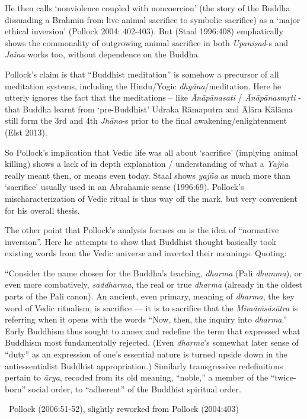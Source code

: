 \newpage

He then calls ‘nonviolence coupled with noncoercion’ (the story of the Buddha dissuading a Brahmin from live animal sacrifice to symbolic sacrifice) as a ‘major ethical inversion’ (Pollock 2004: 402-403). But (Staal 1996:408) emphatically shows the commonality of outgrowing animal sacrifice in both \textit{Upaniṣad}-s and \textit{Jaina} works too, without dependence on the Buddha.

Pollock’s claim is that “Buddhist meditation” is somehow a precursor of all meditation systems, including the Hindu/Yogic \textit{dhyāna}/medita\-tion. Here he utterly ignores the fact that the meditations – like \textit{Ānāpānasati} / \textit{Ānāpānasmṛti} - that Buddha learnt from ‘pre-Buddhist’ Udraka Rāmaputra and Ālāra Kālāma still form the 3rd and 4th \textit{Jhāna}-s prior to the final awakening/enlightenment (Elst 2013).

So Pollock’s implication that Vedic life was all about ‘sacrifice’ (implying animal killing) shows a lack of in depth explanation / understanding of what a \textit{Yajña} really meant then, or means even today. Staal shows \textit{yajña} as much more than ‘sacrifice’ usually used in an Abrahamic sense (1996:69). Pollock’s mischaracterization of Vedic ritual is thus way off the mark, but very convenient for his overall thesis.

The other point that Pollock’s analysis focuses on is the idea of “normative inversion”. Here he attempts to show that Buddhist thought basically took existing words from the Vedic universe and inverted their meanings. Quoting:

\begin{myquote}
“Consider the name chosen for the Buddha’s teaching, \textit{dharma} (Pali \textit{dhamma}), or even more combatively, \textit{saddharma}, the real or true \textit{dharma} (already in the oldest parts of the Pali canon). An ancient, even primary, meaning of \textit{dharma}, the key word of Vedic ritualism, is sacriﬁce — it is to sacriﬁce that the \textit{Mīmāṁsāsūtra} is referring when it opens with the words “Now, then, the inquiry into \textit{dharma}.” Early Buddhism thus sought to annex and redeﬁne the term that expressed what Buddhism most fundamentally rejected. (Even \textit{dharma}’s somewhat later sense of “duty” as an expression of one’s essential nature is turned upside down in the antiessentialist Buddhist appropriation.) Similarly transgressive redeﬁnitions pertain to \textit{ārya}, recoded from its old meaning, “noble,” a member of the “twice-born” social order, to “adherent” of the Buddhist spiritual order. 

~\hfill Pollock (2006:51-52), slightly reworked from Pollock (2004:403)
\end{myquote}

